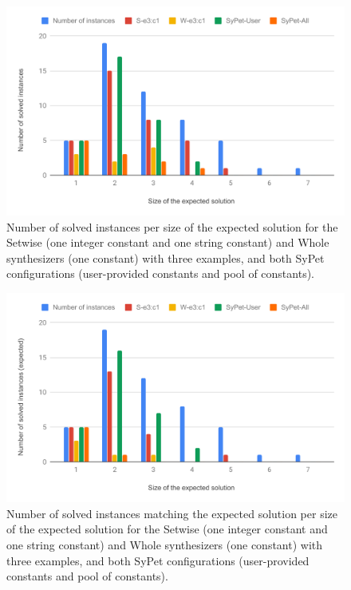 \begin{figure}
  \centering
  \includegraphics[width=1.0\textwidth]{assets/comparison-solved-sypet.pdf}
  \caption{Number of solved instances per size of the expected solution for the
    Setwise (one integer constant and one string constant) and Whole
    synthesizers (one constant) with three examples, and both SyPet
    configurations (user-provided constants and pool of constants).}
  \label{fig:comparison-solved-sypet}
\end{figure}

\begin{figure}
  \centering
  \includegraphics[width=1.0\textwidth]{assets/comparison-expected-sypet.pdf}
  \caption{Number of solved instances matching the expected solution per size of
    the expected solution for the Setwise (one integer constant and one string
    constant) and Whole synthesizers (one constant) with three examples, and
    both SyPet configurations (user-provided constants and pool of constants).}
  \label{fig:comparison-expected-sypet}
\end{figure}

